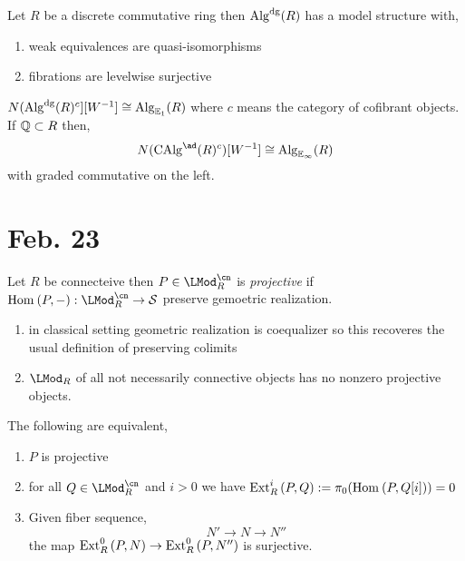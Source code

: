\documentclass[12pt]{article}
\begin{document}
Let $R$ be a discrete commutative ring then $\mathrm{Alg}^{\mathrm{dg}}(R)$ has a model structure with,
\begin{enumerate}
\item weak equivalences are quasi-isomorphisms
\item fibrations are levelwise surjective 
\end{enumerate}

\begin{prop}
$N(\mathrm{Alg}^{\mathrm{dg}}(R)^c][W^{-1}] \cong \mathrm{Alg}_{\mathbb{E}_1}(R)$ where $c$ means the category of cofibrant objects. If $\mathbb{Q} \subset R$ then,
\[ N(\CAlg^{\ad}(R)^c)[W^{-1}] \cong \Alg_{\EE_\infty}(R) \]
with graded commutative on the left.
\end{prop}

\section{Feb. 23}

\begin{defn}
Let $R$ be connecteive then $P \in \LMod_R^\cn$ is \textit{projective} if $\Hom{}{P}{-} : \LMod_R^\cn \to \S$ preserve gemoetric realization.
\end{defn}

\begin{rmk}
\begin{enumerate}
\item in classical setting geometric realization is coequalizer so this recoveres the usual definition of preserving colimits

\item $\LMod_R$ of all not necessarily connective objects has no nonzero projective objects. 
\end{enumerate}
\end{rmk}

\begin{prop}
The following are equivalent,
\begin{enumerate}
\item $P$ is projective

\item for all $Q \in \LMod_R^\cn$ and $i > 0$ we have $\mathrm{Ext}^{i}_{R} \left( P, Q \right) := \pi_0(\mathrm{Hom}_{} \left( P, Q[i] \right)) = 0$

\item Given fiber sequence,
\[ N' \to N \to N'' \]
the map $\mathrm{Ext}^{0}_{R} \left( P, N \right) \to \mathrm{Ext}^{0}_{R} \left( P, N'' \right)$ is surjective.
\end{enumerate}
\end{prop}
\end{document}
